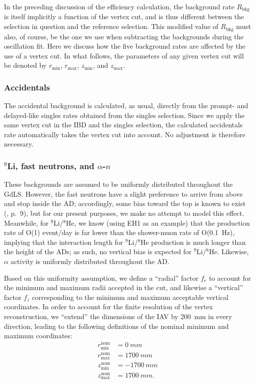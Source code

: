 \documentclass[../thesis.tex]{subfiles}
\begin{document}
In the preceding discussion of the efficiency calculation, the background rate $R_{\mathrm{bkg}}$ is itself implicitly a function of the vertex cut, and is thus different between the selection in question and the reference selection. This modified value of $R_{\mathrm{bkg}}$ must also, of course, be the one we use when subtracting the backgrounds during the oscillation fit. Here we discuss how the five background rates are affected by the use of a vertex cut. In what follows, the parameters of any given vertex cut will be denoted by $r_{\mathrm{min}}$, $r_{\mathrm{max}}$, $z_{\mathrm{min}}$, and $z_{\mathrm{max}}$.

\subsubsection{Accidentals}

The accidental background is calculated, as usual, directly from the prompt- and delayed-like singles rates obtained from the singles selection. Since we apply the same vertex cut in the IBD and the singles selection, the calculated accidentals rate automatically takes the vertex cut into account. No adjustment is therefore necessary.

\subsubsection{$^9$Li, fast neutrons, and $\alpha$-$n$}

These backgrounds are assumed to be uniformly distributed throughout the GdLS. However, the fast neutrons have a slight preference to arrive from above and stop inside the AD; accordingly, some bias toward the top is known to exist (\cite{jianrunHERA}, p.\ 9), but for our present purposes, we make no attempt to model this effect.
%
Meanwhile, for $^9$Li/$^8$He, we know (using EH1 as an example) that the production rate of O(1) event/day is far lower than the shower-muon rate of O(0.1~Hz), implying that the interaction length for $^9$Li/$^8$He production is much longer than the height of the ADs; as such, no vertical bias is expected for $^9$Li/$^8$He.
%
Likewise, $\alpha$ activity is uniformly distributed throughout the AD.

Based on this uniformity assumption, we define a ``radial'' factor $f_r$ to account for the minimum and maximum radii accepted in the cut, and likewise a ``vertical'' factor $f_z$ corresponding to the minimum and maximum acceptable vertical coordinates. In order to account for the finite resolution of the vertex reconstruction, we ``extend'' the dimensions of the IAV by 200~mm in every direction, leading to the following definitions of the nominal minimum and maximum coordinates:
\begin{equation}
  \begin{aligned}
  r_{\mathrm{min}}^{\mathrm{nom}} &= \SI{0}{mm}\\
  r_{\mathrm{max}}^{\mathrm{nom}} &= \SI{1700}{mm}\\
  z_{\mathrm{min}}^{\mathrm{nom}} &= \SI{-1700}{mm}\\
  z_{\mathrm{max}}^{\mathrm{nom}} &= \SI{1700}{mm}.
\end{aligned}
\end{equation}
\end{document}
